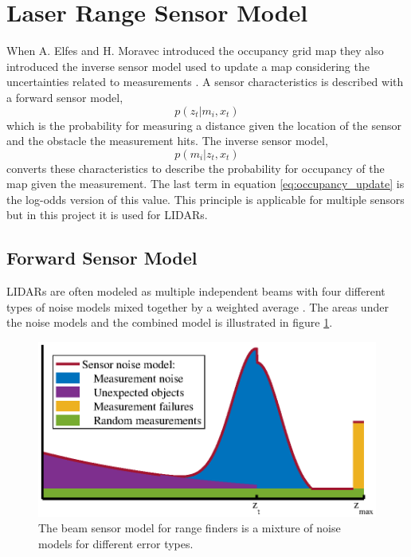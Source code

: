 \section{Laser Range Sensor Model}
\label{sec:laser_range_sensor}
When A. Elfes and H. Moravec introduced the occupancy grid map they also introduced the inverse sensor model used to update a map considering the uncertainties related to measurements \cite{elfesMoravecOccGrid}. 
A sensor characteristics is described with a forward sensor model, 
\begin{equation*}
	p(z_t|m_i,x_t)
\end{equation*}
which is the probability for measuring a distance given the location of the sensor and the obstacle the measurement hits. 
The inverse sensor model,
\begin{equation*}
	p(m_i|z_t,x_t)
\end{equation*}
converts these characteristics to describe the probability for occupancy of the map given the measurement. The last term in equation \vref{eq:occupancy_update} is the log-odds version of this value.
This principle is applicable for multiple sensors but in this project it is used for LIDARs. 


\subsection{Forward Sensor Model}
LIDARs are often modeled as multiple independent beams with four different types of noise models mixed together by a weighted average \cite{probRob}.
The areas under the noise models and the combined model is illustrated in figure \ref{fig:sensor_noise_model}.
\begin{figure}
\centering
\includegraphics[scale=1]{figures/static_mapping/sensor_noise_model}
\caption{The beam sensor model for range finders is a mixture of noise models for different error types.}
\label{fig:sensor_noise_model}
\end{figure}


